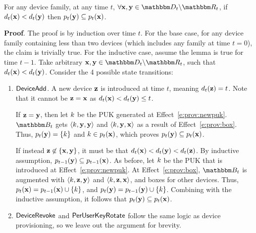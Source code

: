 \begin{lemma}
  For any device family, at any time $t$, $\forall \zdev{x},\zdev{y} \in \zset{d}_t
\setsub \zset{r}_t$, if $d_t(\mathbf{x}) <
d_t(\mathbf{y})$ then $p_t(\mathbf{y}) \subseteq
p_t(\mathbf{x})$.
 \label{l:puks}
\end{lemma}

\textbf{Proof}.
%
The proof is by induction over time $t$. For the base case, for any device family containing less
than two devices (which includes any family at time $t=0$), the claim is trivially true.
For the inductive case, assume the lemma is true for time $t-1$.
Take arbitrary $\zdev{x},\zdev{y} \in \zset{d}_t \setsub \zset{r}_t$, such that $d_t(\mathbf{x}) <
d_t(\mathbf{y})$.  Consider the 4 possible state transitions:
%
\begin{enumerate} 
  \item $\mathsf{DeviceAdd}{}$. A new device $\mathbf{z}$ is introduced at time $t$, meaning
$d_t(\mathbf{z}) = t$. Note that it cannot be $\mathbf{z} = \mathbf{x}$ as $d_t(\mathbf{x})
< d_t(\mathbf{y}) \leq t$.

If $\mathbf{z} = \mathbf{y}$, then let ${k}$ be the PUK generated at Effect~\ref{e:prov:newpuk}.
$\zset{B}_t$ gets $\langle {k}, \mathbf{y}, \mathbf{y} \rangle$ and $\langle {k}, \mathbf{y},
\mathbf{x} \rangle$ as a result of Effect~\ref{e:prov:box}. Thus, $p_t(\mathbf{y}) = \left\{
{k} \right\}$ and ${k} \in p_t(\mathbf{x})$, which proves $p_t(\mathbf{y}) \subseteq
p_t(\mathbf{x})$.

If instead $\mathbf{z} \not\in \{\mathbf{x},\mathbf{y}\}$, it must be that $d_t(\mathbf{x}) <
d_t(\mathbf{y}) < d_t(\mathbf{z})$. By inductive assumption, $p_{t-1}(\mathbf{y})
\subseteq p_{t-1}(\mathbf{x})$. As before, let ${k}$ be the PUK that is introduced at
Effect~\ref{e:prov:newpuk}. At Effect~\ref{e:prov:box}, $\zset{b}_t$ is augmented with $\langle
{k}, \mathbf{z}, \mathbf{y} \rangle$ and $\langle {k}, \mathbf{z}, \mathbf{x} \rangle$, and boxes
for other devices. Thus, $p_t(\mathbf{x}) = p_{t-1}(\mathbf{x}) \cup \left\{ k \right\}$, and
$p_t(\mathbf{y}) = p_{t-1}(\mathbf{y}) \cup \left\{ k \right\}$. Combining with the inductive
assumption, it follows that $p_t(\mathbf{y}) \subseteq p_t(\mathbf{x})$.

 \item $\mathsf{DeviceRevoke}{}$ and $\mathsf{PerUserKeyRotate}{}$ follow the
 same logic as device provisioning, so we leave out the argument for brevity.


\end{enumerate}
